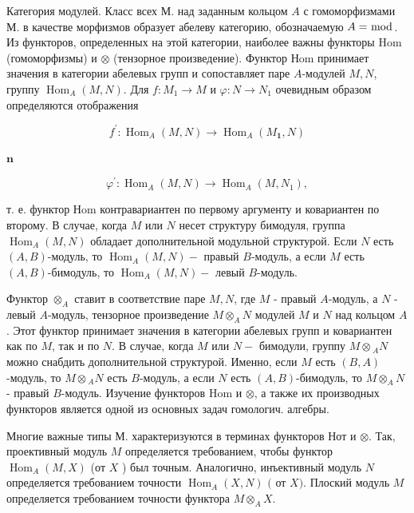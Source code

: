 \documentclass[10pt]{article}
\begin{document}
Категория модулей. Класс всех М. над заданным кольцом $A$ с гомоморфизмами М. в качестве морфизмов образует абелеву категорию, обозначаемую $A=\bmod$. Из функторов, определенных на этой категории, наиболее важны функторы Hom (гомоморфизмы) и $\otimes$ (тензорное произведение). Функтор Нom принимает значения в категории абелевых групп и сопоставляет паре $A$-модулей $M, N$, группу $\operatorname{Hom}_{A}(M, N)$. Для $f: M_{1} \rightarrow M$ и $\varphi: N \rightarrow N_{1}$ очевидным образом определяются отображения



\[

f^{\prime}: \operatorname{Hom}_{A}(M, N) \longrightarrow \operatorname{Hom}_{A}\left(M_{\mathbf{1}}, N\right)

\]



$\mathbf{n}$



\[

\varphi^{\prime}: \operatorname{Hom}_{A}(M, N) \rightarrow \operatorname{Hom}_{A}\left(M, N_{1}\right),

\]



т. е. функтор Нom контравариантен по первому аргументу и ковариантен по второму. В случае, когда $M$ или $N$ несет структуру бимодуля, группа $\operatorname{Hom}_{A}(M, N)$ обладает дополнительной модульной структурой. Если $N$ есть $(A, B)$-модуль, то $\operatorname{Hom}_{A}(M, N)-$ правый $B$-модуль, а если $M$ есть $(A, B)$-бимодуль, то $\operatorname{Hom}_{A}(M, N)-$ левый $B$-модуль.



Функтор $\otimes_{A}$ ставит в соответствие паре $M, N$, где $M$ - правый $A$-модуль, а $N$ - левый $A$-модуль, тензорное произведение $M \otimes_{A} N$ модулей $M$ и $N$ над кольцом $A$. Этот функтор принимает значения в категории абелевых групп и ковариантен как по $M$, так и по $N$. В случае, когда $M$ или $N-$ бимодули, группу $M \otimes{ }_{A} N$ можно снабдить дополнительной структурой. Именно, если $M$ есть $(B, A)$-модуль, то $M \otimes{ }_{A} N$ есть $B$-модуль, а если $N$ есть $(A, B)$-бимодуль, то $M \otimes_{A} N$ - правый $B$-модуль. Изучение функторов Hom и $\otimes$, а также их производных функторов является одной из основных задач гомологич. алгебры.



Многие важные типы М. характеризуются в терминах функторов Нот и $\otimes$. Так, проективный модуль $M$ определяется требованием, чтобы функтор $\operatorname{Hom}_{A}(M, X)$ (от $X$ ) был точным. Аналогично, инъективный модуль $N$ определяется требованием точности $\operatorname{Hom}_{A}(X, N)$ $($ от $X)$. Плоский модуль $M$ определяется требованием точности функтора $M \otimes_{A} X$.
\end{document}
